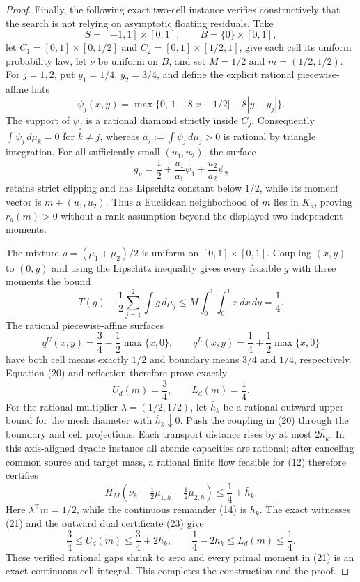 \documentclass{article}
\begin{document}
\begin{proof}
Finally, the following exact two-cell instance verifies constructively that
the search is not relying on asymptotic floating residuals.  Take
\[
 S=[-1,1]\times[0,1],\qquad B=\{0\}\times[0,1],
\]
let \(C_1=[0,1]\times[0,1/2]\) and
\(C_2=[0,1]\times[1/2,1]\), give each cell its uniform probability law, let
\(\nu\) be uniform on \(B\), and set \(M=1/2\) and
\(m=(1/2,1/2)\).  For \(j=1,2\), put \(y_1=1/4\), \(y_2=3/4\), and define the
explicit rational piecewise-affine hats
\[
 \psi_j(x,y)=\max\{0,\,1-8|x-1/2|-8|y-y_j|\}.
\]
The support of \(\psi_j\) is a rational diamond strictly inside \(C_j\).
Consequently \(\int\psi_j\,d\mu_k=0\) for \(k\neq j\), whereas
\(a_j:=\int\psi_j\,d\mu_j>0\) is rational by triangle integration.  For all
sufficiently small \((u_1,u_2)\), the surface
\[
 g_u=\frac12+\frac{u_1}{a_1}\psi_1+
                  \frac{u_2}{a_2}\psi_2
\]
retains strict clipping and has Lipschitz constant below \(1/2\), while its
moment vector is \(m+(u_1,u_2)\).  Thus a Euclidean neighborhood of \(m\)
lies in \(K_d\), proving \(r_d(m)>0\) without a rank assumption beyond the
displayed two independent moments.

The mixture \(\rho=(\mu_1+\mu_2)/2\) is uniform on
\([0,1]\times[0,1]\).  Coupling \((x,y)\) to \((0,y)\) and using the
Lipschitz inequality gives every feasible \(g\) with these moments the bound
\[
 T(g)-\frac12\sum_{j=1}^2\int g\,d\mu_j
 \leq M\int_0^1\!\int_0^1x\,dx\,dy=\frac14.                \tag{20}
\]
The rational piecewise-affine surfaces
\[
 q^U(x,y)=\frac34-\frac12\max\{x,0\},
 \qquad
 q^L(x,y)=\frac14+\frac12\max\{x,0\}                       \tag{21}
\]
have both cell means exactly \(1/2\) and boundary means \(3/4\) and \(1/4\),
respectively.  Equation (20) and reflection therefore prove exactly
\[
 U_d(m)=\frac34,
 \qquad L_d(m)=\frac14.                                    \tag{22}
\]
For the rational multiplier \(\lambda=(1/2,1/2)\), let \(\bar h_k\) be a
rational outward upper bound for the mesh diameter with
\(\bar h_k\downarrow0\).  Push the coupling in (20) through the boundary and
cell projections.  Each transport distance rises by at most
\(2\bar h_k\).  In this axis-aligned dyadic instance all atomic capacities are
rational; after canceling common source and target mass, a rational finite
flow feasible for (12) therefore certifies
\[
 H_M\!\left(\nu_h-\tfrac12\mu_{1,h}-\tfrac12\mu_{2,h}\right)
 \leq\frac14+\bar h_k.                                     \tag{23}
\]
Here \(\lambda^\top m=1/2\), while the continuous remainder (14) is
\(\bar h_k\).  The exact witnesses (21) and the outward dual certificate (23)
give
\[
 \frac34\leq U_d(m)\leq\frac34+2\bar h_k,
 \qquad
 \frac14-2\bar h_k\leq L_d(m)\leq\frac14.                 \tag{24}
\]
These verified rational gaps shrink to zero and every primal moment in (21)
is an exact continuous cell integral.  This completes the construction and
the proof.
\end{proof}
\end{document}
